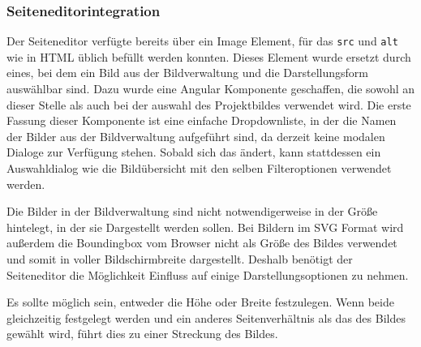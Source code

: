 \subsubsection{Seiteneditorintegration}

Der Seiteneditor verfügte bereits über ein Image Element, für das \texttt{src}
und \texttt{alt} wie in HTML üblich befüllt werden konnten. Dieses Element wurde
ersetzt durch eines, bei dem ein Bild aus der Bildverwaltung und die
Darstellungsform auswählbar sind. Dazu wurde eine Angular Komponente geschaffen,
die sowohl an dieser Stelle als auch bei der auswahl des Projektbildes verwendet
wird. Die erste Fassung dieser Komponente ist eine einfache Dropdownliste, in
der die Namen der Bilder aus der Bildverwaltung aufgeführt sind, da derzeit
keine modalen Dialoge zur Verfügung stehen. Sobald sich das ändert, kann
stattdessen ein Auswahldialog wie die Bildübersicht mit den selben
Filteroptionen verwendet werden.

Die Bilder in der Bildverwaltung sind nicht notwendigerweise in der Größe
hintelegt, in der sie Dargestellt werden sollen. Bei Bildern im SVG Format
wird außerdem die Boundingbox vom Browser nicht als Größe des Bildes verwendet
und somit in voller Bildschirmbreite dargestellt. Deshalb benötigt der
Seiteneditor die Möglichkeit Einfluss auf einige Darstellungsoptionen zu nehmen.

Es sollte möglich sein, entweder die Höhe oder Breite festzulegen. Wenn beide
gleichzeitig festgelegt werden und ein anderes Seitenverhältnis als das des
Bildes gewählt wird, führt dies zu einer Streckung des Bildes.

